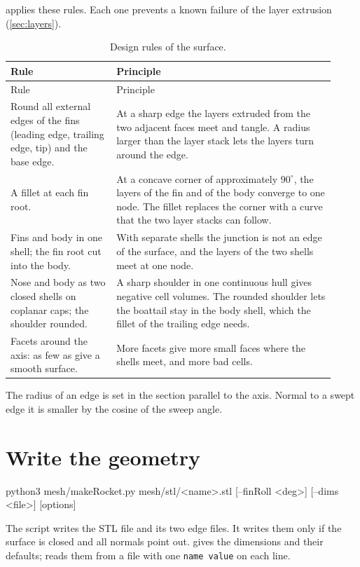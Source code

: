  applies these rules. Each one prevents a known failure of
the layer extrusion (\cref{sec:layers}).

\begin{longtable}{@{}P{0.30\linewidth} P{0.62\linewidth}@{}}
\caption{Design rules of the surface.}\label{tab:surface-rules}\\
\toprule
Rule & Principle \\
\midrule
\endfirsthead
\toprule
Rule & Principle \\
\midrule
\endhead
Round all external edges of the fins (leading edge, trailing edge, tip) and the base edge. & At a sharp edge the layers extruded from the two adjacent faces meet and tangle. A radius larger than the layer stack lets the layers turn around the edge. \\
A fillet at each fin root. & At a concave corner of approximately $90^\circ$, the layers of the fin and of the body converge to one node. The fillet replaces the corner with a curve that the two layer stacks can follow. \\
Fins and body in one shell; the fin root cut into the body. & With separate shells the junction is not an edge of the surface, and the layers of the two shells meet at one node. \\
Nose and body as two closed shells on coplanar caps; the shoulder rounded. & A sharp shoulder in one continuous hull gives negative cell volumes. The rounded shoulder lets the boattail stay in the body shell, which the fillet of the trailing edge needs. \\
Facets around the axis: as few as give a smooth surface. & More facets give more small faces where the shells meet, and more bad cells. \\
\bottomrule
\end{longtable}

The radius of an edge is set in the section parallel to the axis. Normal to a swept
edge it is smaller by the cosine of the sweep angle.

\section{Write the geometry}\label{sec:makerocket}

\begin{shell}
python3 mesh/makeRocket.py mesh/stl/<name>.stl [--finRoll <deg>] [--dims <file>] [options]
\end{shell}

The script writes the STL file and its two edge files. It writes them only if the
surface is closed and all normals point out.  gives
the dimensions and their defaults;  reads them from a file with one
\texttt{name value} on each line.

